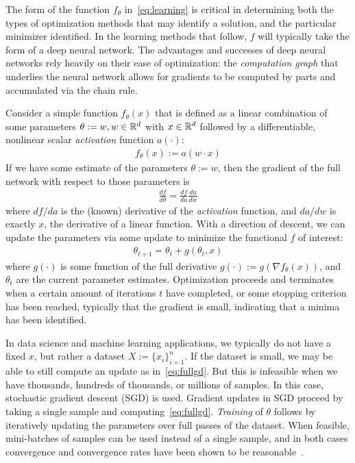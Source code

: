 The form of the function $f_\theta$ in~\eqref{eq:learning}
is critical in determining both
the types of optimization methods
that may identify a solution,
and the particular minimizer identified.
In the learning methods that follow,
$f$ will typically take the form of 
a deep neural network.
The advantages
and successes of deep neural networks
rely heavily on their ease of optimization:
the \textit{computation graph} that 
underlies the neural network
allows for gradients
to be computed by parts
and accumulated via the chain rule.

Consider a simple function $f_\theta(x)$
that is defined as a linear combination of 
some parameters $\theta:=w, w\in \mathbb{R}^d$ with $x\in \mathbb{R}^d$ followed by 
a differentiable, nonlinear scalar \textit{activation} function $a(\cdot)$:
\begin{align}\label{eq:wx}
	f_\theta(x) := a(w\cdot x)
\end{align}
If we have some estimate of the parameters $\theta:=w$,
then the gradient of the full network with respect to those parameters is
\begin{align}
	\frac{df}{d\theta} = \frac{df}{da}\frac{da}{dw}
\end{align}
where $df/da$ is the (known) derivative of the \textit{activation} function,
and $da/dw$ is exactly $x$, the derivative of a linear function.
With a direction of descent,
we can update the parameters via some update to minimize the functional $f$ of interest:
\begin{align}\label{eq:fullgd}
	\theta_{t+1} = \theta_t + g(\theta_t,x)
\end{align}
where $g(\cdot)$ is some function of the full derivative $g(\cdot) := g(\nabla f_\theta(x))$,
and $\theta_t$ are the current parameter estimates.
Optimization proceeds and terminates when a certain amount
of iterations $t$ have completed,
or some stopping criterion has been reached,
typically that the gradient is small,
indicating that a minima has been identified.

In data science and machine learning applications,
we typically do not have a fixed $x$, but 
rather a dataset $X:=\{x_i\}_{i=1}^n$.
If the dataset is small,
we may be able to still compute an update as in~\eqref{eq:fullgd}.
But this is infeasible when we have thousands,
hundreds of thousands, or millions of samples.
In this case,
stochastic gradient descent (SGD) is used.
Gradient updates in SGD proceed
by taking a single sample and computing~\eqref{eq:fullgd}.
\textit{Training} of $\theta$
follows by iteratively updating the parameters
over full passes of the dataset.
When feasible, mini-batches of samples can
be used instead of a single sample,
and in both cases convergence and convergence
rates have been shown to be reasonable~\citep{hardt2016train}.

